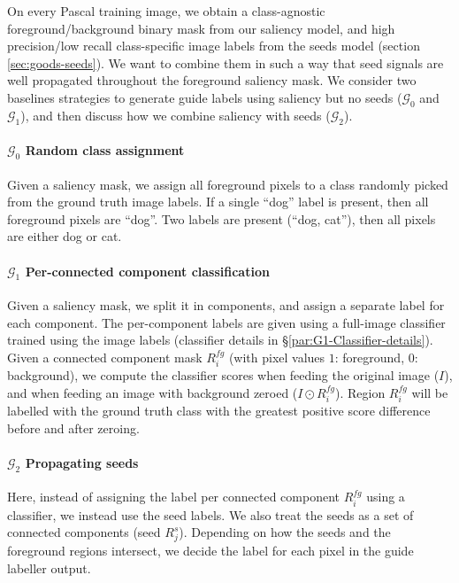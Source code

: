 \documentclass[british,10pt,twocolumn,letterpaper]{article}
\begin{document}
 On every Pascal training image, we obtain a class-agnostic foreground/background
 binary mask from our saliency model, and high precision/low recall
 class-specific image labels from the seeds model (section \ref{sec:goods-seeds}).
 We want to combine them in such a way that seed signals are well propagated
 throughout the foreground saliency mask. We consider two baselines
 strategies to generate guide labels using saliency but no seeds ($\mathcal{G}_{0}$
 and $\mathcal{G}_{1}$), and then discuss how we combine saliency
 with seeds ($\mathcal{G}_{2}$). 

\paragraph{$\mathcal{G}_{0}$ Random class assignment}

Given a saliency mask, we assign all foreground pixels to a class
randomly picked from the ground truth image labels. If a single ``dog''
label is present, then all foreground pixels are ``dog''. Two labels
are present (``dog, cat''), then all pixels are either dog or cat.

\paragraph{$\mathcal{G}_{1}$ Per-connected component classification}

Given a saliency mask, we split it in components, and assign a separate
label for each component. The per-component labels are given using
a full-image classifier trained using the image labels (classifier
details in \S \ref{par:G1-Classifier-details}). Given a connected
component mask $R_{i}^{fg}$ (with pixel values $1$: foreground,
$0$: background), we compute the classifier scores when feeding the
original image ($I$), and when feeding an image with background zeroed
($I\odot R_{i}^{fg}$). Region $R_{i}^{fg}$ will be labelled with
the ground truth class with the greatest positive score difference
before and after zeroing.

\paragraph{$\mathcal{G}_{2}$ Propagating seeds}

Here, instead of assigning the label per connected component $R_{i}^{fg}$
using a classifier, we instead use the seed labels. We also treat
the seeds as a set of connected components (seed $R_{j}^{s}$). Depending
on how the seeds and the foreground regions intersect, we decide the
label for each pixel in the guide labeller output. 
\end{document}
